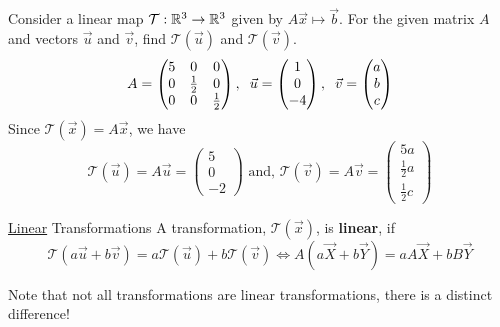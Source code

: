 \begin{example}{}{}
    Consider a linear map $\mathcal{T}: \mathbb R^{3} \to \mathbb R^{3}$ given by $A\vec{x} \mapsto \vec{b}$. For the given matrix $A$ and vectors $\vec{u}$ and $\vec{v}$, find $\mathcal{T}\left(\vec{u}\right)$ and $\mathcal{T}\left(\vec{v}\right)$.
    \[
        A = \begin{pmatrix}
            5 & 0 & 0 \\
            0 & \frac{1}{2} & 0 \\
            0 & 0 & \frac{1}{2}
        \end{pmatrix},
        \hspace{0.2cm}
        \vec{u} = \begin{pmatrix}
            1 \\ 0 \\ -4
        \end{pmatrix},
        \hspace{0.2cm}
        \vec{v} = \begin{pmatrix}
            a \\ b \\ c
        \end{pmatrix}
    \]
    Since $\mathcal{T}\left(\vec{x}\right) = A\vec{x}$, we have 
    \[
        \mathcal{T}\left(\vec{u}\right) = A\vec{u} = \begin{pmatrix}
            5 \\ 0 \\ -2
        \end{pmatrix}
        \text{ and,  }
        \mathcal{T}\left(\vec{v}\right) = A\vec{v} = \begin{pmatrix}
            5a \\ \frac{1}{2}a \\ \frac{1}{2}c
        \end{pmatrix}
    \]
\end{example}

\begin{defbox}{\underline{Linear} Transformations}{}
    A transformation, $\mathcal{T}(\vec{x})$, is \textbf{linear}, if 
    \[\mathcal{T}\left(a\vec{u} + b\vec{v}\right) = a\mathcal{T}\left(\vec{u}\right) + b\mathcal{T}\left(\vec{v}\right) \Leftrightarrow A\left(a\vec{X} + b\vec{Y}\right) = aA\vec{X} + bB\vec{Y}\]
\end{defbox}

Note that not all transformations are linear transformations, there is a distinct difference!

